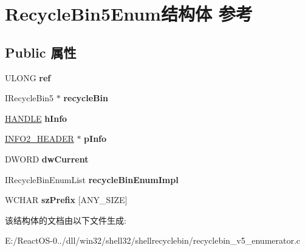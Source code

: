 \hypertarget{struct_recycle_bin5_enum}{}\section{Recycle\+Bin5\+Enum结构体 参考}
\label{struct_recycle_bin5_enum}
\subsection*{Public 属性}
\begin{DoxyCompactItemize}
\item 
\mbox{\label{struct_recycle_bin5_enum_a869354151a04eae75579cc0055bfc32e}} 
U\+L\+O\+NG {\bfseries ref}
\item 
\mbox{\label{struct_recycle_bin5_enum_ad2bf589a79f87e0d32dacb82a23d7d66}} 
I\+Recycle\+Bin5 $\ast$ {\bfseries recycle\+Bin}
\item 
\mbox{\label{struct_recycle_bin5_enum_a8095c1c144ffa7e1e441b80b11bff140}} 
\hyperlink{interfacevoid}{H\+A\+N\+D\+LE} {\bfseries h\+Info}
\item 
\mbox{\label{struct_recycle_bin5_enum_ae62d6cf3035baeccac4794b5d22dd68e}} 
\hyperlink{struct___i_n_f_o2___h_e_a_d_e_r}{I\+N\+F\+O2\+\_\+\+H\+E\+A\+D\+ER} $\ast$ {\bfseries p\+Info}
\item 
\mbox{\label{struct_recycle_bin5_enum_a378de50e163f727aa35a5204935e3240}} 
D\+W\+O\+RD {\bfseries dw\+Current}
\item 
\mbox{\label{struct_recycle_bin5_enum_a2526b25482051823b3437939fb2b6985}} 
I\+Recycle\+Bin\+Enum\+List {\bfseries recycle\+Bin\+Enum\+Impl}
\item 
\mbox{\label{struct_recycle_bin5_enum_a8818ab51237de607e79cf24b0520a6e1}} 
W\+C\+H\+AR {\bfseries sz\+Prefix} \mbox{[}A\+N\+Y\+\_\+\+S\+I\+ZE\mbox{]}
\end{DoxyCompactItemize}


该结构体的文档由以下文件生成\+:\begin{DoxyCompactItemize}
\item 
E\+:/\+React\+O\+S-\/0../dll/win32/shell32/shellrecyclebin/recyclebin\+\_\+v5\+\_\+enumerator.\+c\end{DoxyCompactItemize}
